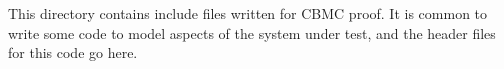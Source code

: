 This directory contains include files written for CBMC proof. It is common to write some code to model aspects of the system under test, and the header files for this code go here. 